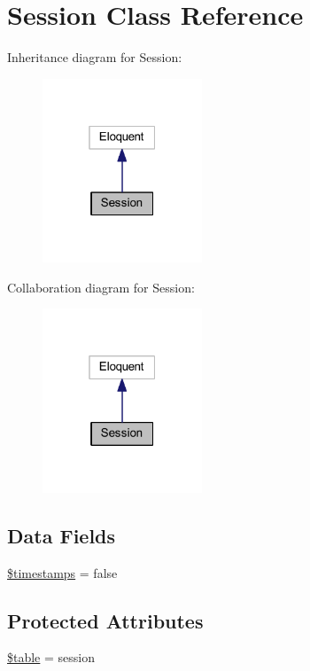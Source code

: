 \hypertarget{class_session}{}\section{Session Class Reference}
\label{class_session}


Inheritance diagram for Session\+:
\nopagebreak
\begin{figure}[H]
\begin{center}
\leavevmode
\includegraphics[width=135pt]{class_session__inherit__graph}
\end{center}
\end{figure}


Collaboration diagram for Session\+:
\nopagebreak
\begin{figure}[H]
\begin{center}
\leavevmode
\includegraphics[width=135pt]{class_session__coll__graph}
\end{center}
\end{figure}
\subsection*{Data Fields}
\begin{DoxyCompactItemize}
\item 
\hyperlink{class_session_a51267c24c8fae742ed8f9be0ba6085ee}{\$timestamps} = false
\end{DoxyCompactItemize}
\subsection*{Protected Attributes}
\begin{DoxyCompactItemize}
\item 
\hyperlink{class_session_ae8876a14058f368335baccf35af4a22b}{\$table} = \textquotesingle{}session\textquotesingle{}
\end{DoxyCompactItemize}


